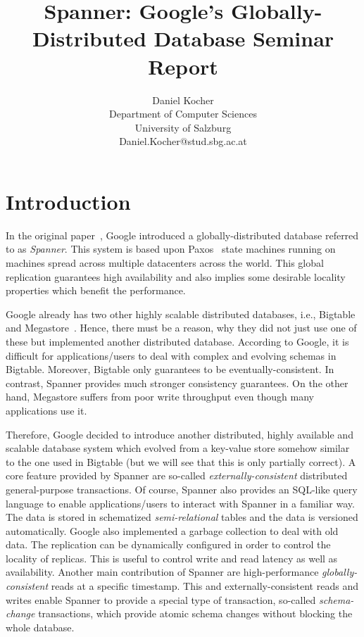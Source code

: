 \documentclass[onecolumn, a4paper, 10pt]{article}
\begin{document}
\title{
  Spanner: Google's Globally-Distributed Database \newline
  Seminar Report
}

\author{
  Daniel Kocher \\
  Department of Computer Sciences \\
  University of Salzburg \\                                                    
  Daniel.Kocher@stud.sbg.ac.at
}

\maketitle

\section{Introduction}
\label{sec:introduction}

In the original paper~\cite{Corbett:2012}, Google introduced a
globally-distributed database referred to as \emph{Spanner}. This system is based
upon Paxos~\cite{Lamport:1998} state machines running on machines spread across
multiple datacenters across the world. This global replication guarantees high
availability and also implies some desirable locality properties which benefit
the performance.

Google already has two other highly scalable distributed databases, i.e.,
Bigtable~\cite{Chang:2008} and Megastore~\cite{Baker:2011}. Hence, there must be
a reason, why they did not just use one of these but implemented another
distributed database. According to Google, it is difficult for applications/users
to deal with complex and evolving schemas in Bigtable. Moreover, Bigtable only
guarantees to be eventually-consistent. In contrast, Spanner provides much
stronger consistency guarantees. On the other hand, Megastore suffers from poor
write throughput even though many applications use it.

Therefore, Google decided to introduce another distributed, highly available and
scalable database system which evolved from a key-value store somehow similar to
the one used in Bigtable (but we will see that this is only partially correct).
A core feature provided by Spanner are so-called \emph{externally-consistent}
distributed general-purpose transactions. Of course, Spanner also provides an
SQL-like query language to enable applications/users to interact with Spanner in
a familiar way. The data is stored in schematized \emph{semi-relational} tables
and the data is versioned automatically. Google also implemented a garbage
collection to deal with old data. The replication can be dynamically configured
in order to control the locality of replicas. This is useful to control write
and read latency as well as availability. Another main contribution of Spanner
are high-performance \emph{globally-consistent} reads at a specific timestamp.
This and externally-consistent reads and writes enable Spanner to provide a
special type of transaction, so-called \emph{schema-change} transactions, which
provide atomic schema changes without blocking the whole database.
\end{document}
